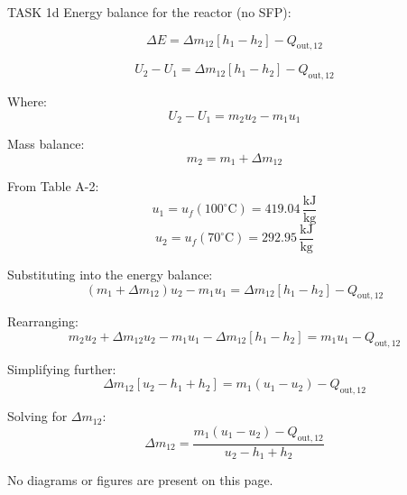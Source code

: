 TASK 1d  
Energy balance for the reactor (no SFP):  

\[
\Delta E = \Delta m_{12} \left[ h_1 - h_2 \right] - Q_{\text{out},12}
\]  

\[
U_2 - U_1 = \Delta m_{12} \left[ h_1 - h_2 \right] - Q_{\text{out},12}
\]  

Where:  
\[
U_2 - U_1 = m_2 u_2 - m_1 u_1
\]  

Mass balance:  
\[
m_2 = m_1 + \Delta m_{12}
\]  

From Table A-2:  
\[
u_1 = u_f(100^\circ\text{C}) = 419.04 \, \frac{\text{kJ}}{\text{kg}}
\]  
\[
u_2 = u_f(70^\circ\text{C}) = 292.95 \, \frac{\text{kJ}}{\text{kg}}
\]  

Substituting into the energy balance:  
\[
(m_1 + \Delta m_{12}) u_2 - m_1 u_1 = \Delta m_{12} \left[ h_1 - h_2 \right] - Q_{\text{out},12}
\]  

Rearranging:  
\[
m_2 u_2 + \Delta m_{12} u_2 - m_1 u_1 - \Delta m_{12} \left[ h_1 - h_2 \right] = m_1 u_1 - Q_{\text{out},12}
\]  

Simplifying further:  
\[
\Delta m_{12} \left[ u_2 - h_1 + h_2 \right] = m_1 (u_1 - u_2) - Q_{\text{out},12}
\]  

Solving for \( \Delta m_{12} \):  
\[
\Delta m_{12} = \frac{m_1 (u_1 - u_2) - Q_{\text{out},12}}{u_2 - h_1 + h_2}
\]  

No diagrams or figures are present on this page.